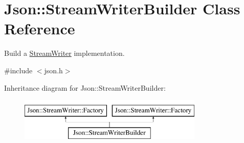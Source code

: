 \hypertarget{class_json_1_1_stream_writer_builder}{}\section{Json\+:\+:Stream\+Writer\+Builder Class Reference}
\label{class_json_1_1_stream_writer_builder}


Build a \hyperlink{class_json_1_1_stream_writer}{Stream\+Writer} implementation.  




{\ttfamily \#include $<$json.\+h$>$}

Inheritance diagram for Json\+:\+:Stream\+Writer\+Builder\+:\begin{figure}[H]
\begin{center}
\leavevmode
\includegraphics[height=2.000000cm]{class_json_1_1_stream_writer_builder}
\end{center}
\end{figure}
